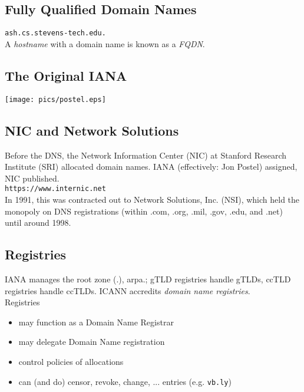 \documentclass[xga]{xdvislides}
\begin{document}
\subsection{Fully Qualified Domain Names}
\vspace{.5in}
\begin{center}
	\Huge
	\verb+ash.cs.stevens-tech.edu.+ \\
	\vspace{.5in}
	A {\em hostname} with a domain name is known as a {\em FQDN}.
\end{center}
\Normalsize

\subsection{The Original IANA}
\vspace*{\fill}
\begin{center}
	\texttt{[image: pics/postel.eps]}
\end{center}
\vspace*{\fill}

\subsection{NIC and Network Solutions}
Before the DNS, the Network Information Center (NIC)
at Stanford Research Institute (SRI) allocated domain
names. IANA (effectively: Jon Postel) assigned, NIC
published.  \\

{\tt https://www.internic.net} \\

In 1991, this was contracted out to Network Solutions,
Inc. (NSI), which held the monopoly on DNS
registrations (within .com, .org, .mil, .gov, .edu, and
.net) until around 1998. \\


\subsection{Registries}
IANA manages the root zone (.), arpa.; gTLD registries
handle gTLDs, ccTLD registries handle ccTLDs.  ICANN
accredits {\em domain name registries}. \\

Registries
\begin{itemize}
	\item may function as a Domain Name Registrar
	\item may delegate Domain Name registration
	\item control policies of allocations
	\item can (and do) censor, revoke, change, ... entries (e.g. {\tt vb.ly})
\end{itemize}
\end{document}
